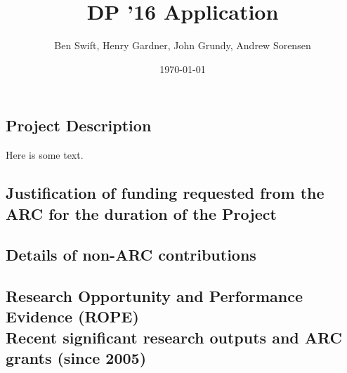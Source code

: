 \documentclass[14pt,a4paper]{scrartcl}
\author{Ben Swift, Henry Gardner, John Grundy, Andrew Sorensen}
\date{\today}
\title{DP '16 Application}
\begin{document}
\renewcommand{\thesection}{\Alph{section}}

\setcounter{section}{3} %
\subsection{Project Description}
\label{sec:project-description}

Here is some text.

\setcounter{section}{5} %
\setcounter{subsection}{0}
\subsection{Justification of funding requested from the ARC for the
  duration of the Project}
\label{sec:funding-justification}



\subsection{Details of non-ARC contributions}
\label{sec:non-arc-contributions}


\setcounter{section}{6}
\setcounter{subsection}{11} %
\subsection{Research Opportunity and Performance Evidence (ROPE)\\
  Recent significant research outputs and ARC grants (since 2005)}
\label{sec:recent-significant-outputs}
\end{document}
